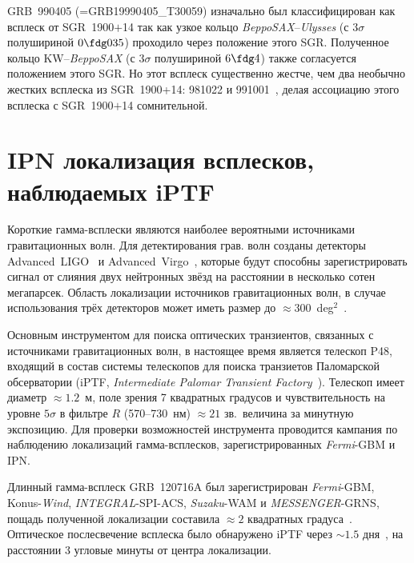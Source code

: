 GRB~990405 (=GRB19990405\_T30059) изначально был классифицирован как всплеск
от SGR~1900$+$14 так как узкое кольцо \textit{BeppoSAX}--\textit{Ulysses} 
(с $3\sigma$ полушириной $0\fdg035$) проходило через положение 
этого SGR. Полученное кольцо KW--\textit{BeppoSAX} (с $3\sigma$ полушириной
$6\fdg4$) также согласуется положением этого SGR. Но этот всплеск 
существенно жестче, чем два необычно жестких всплеска из SGR~1900+14: 
981022 и 991001~\citep{Woods_1999ApJ}, делая ассоциацию этого всплеска 
с SGR~1900$+$14 сомнительной.
\FloatBarrier

\section{IPN локализация всплесков, наблюдаемых iPTF}
Короткие гамма-всплески являются наиболее вероятными источниками гравитационных
волн. Для детектирования грав. волн созданы детекторы  Advanced~LIGO~\citep{LIGO_2015CQGra} 
и Advanced~Virgo~\citep{Acernese_2015CQGra}, которые будут способны зарегистрировать сигнал от слияния
двух нейтронных звёзд на расстоянии в несколько сотен мегапарсек.
Область локализации источников гравитационных волн, в случае использования 
трёх детекторов может иметь размер до $\approx 300$~deg$^2$~\citep{Singer_2015PhDT}.

Основным инструментом для поиска оптических транзиентов, связанных с источниками 
гравитационных волн, в настоящее время является телескоп P48, входящий в состав 
системы телескопов для поиска транзиетов Паломарской обсерватории
(iPTF, \textit{Intermediate Palomar Transient Factory}~\citep{Rau_2009PASP}). 
Телескоп имеет диаметр $\approx 1.2$~м, поле зрения 7 квадратных градусов и 
чувствительность на уровне $5\sigma$ в фильтре $R$ (570--730~нм) $\approx 21$ зв.~величина за минутную экспозицию.
Для проверки возможностей инструмента проводится кампания по наблюдению локализаций
гамма-всплесков, зарегистрированных \textit{Fermi}-GBM и IPN.

Длинный гамма-всплеск GRB~120716A был зарегистрирован  \textit{Fermi}-GBM, Konus-\textit{Wind}, 
\textit{INTEGRAL}-SPI-ACS, \textit{Suzaku}-WAM и \textit{MESSENGER}-GRNS,
пощадь полученной локализации  составила $\approx 2$ квадратных градуса~\citep{Hurley_2012GCN13487}.
Оптическое послесвечение всплеска было обнаружено iPTF 
через $\sim 1.5$ дня~\citep{Cenko_2012GCN13489}, на расстоянии 3 угловые минуты от центра локализации.

